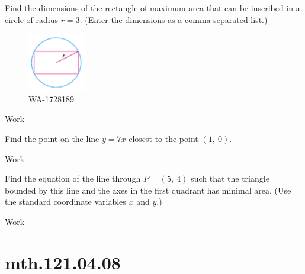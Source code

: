 \documentclass[12pt,addpoints, answers, fleqn]{exam}
\begin{document}
\begin{teacher}
\begin{questions}
\question 	%

Find the dimensions of the rectangle of maximum area that can be inscribed in a circle of radius $r = 3$. (Enter the dimensions as a comma-separated list.)
 \begin{figure}[htbp] %
   \centering
   \includegraphics[width=1in]{./graphics/1728189.pdf} 
   \caption{WA-1728189}
   \label{fig:1728189}
\end{figure}
\begin{solution}
Work
\end{solution}
 
\question 	%

Find the point on the line $y = 7x$ closest to the point $\left(1, \ 0\right)$.

\begin{solution}
Work
\end{solution}

\question 	%

Find the equation of the line through $P = \left(5, \ 4 \right)$ such that the triangle bounded by this line and the axes in the first quadrant has minimal area. (Use the standard coordinate variables $x$ and $y$.)
 
 \begin{solution}
Work
\end{solution}

\end{questions}
\end{teacher}


\vfill
\pagebreak

\vfill
\pagebreak


\section{mth.121.04.08}
\end{document}
